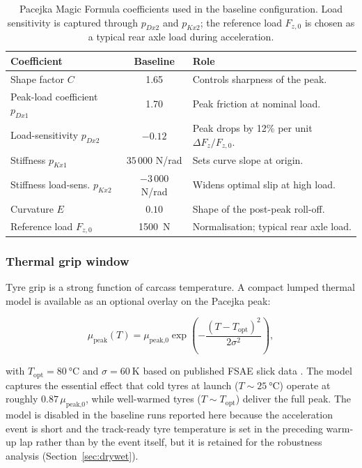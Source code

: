 \begin{table}[H]
\centering
\caption{Pacejka Magic Formula coefficients used in the baseline
configuration. Load sensitivity is captured through $p_{Dx2}$ and
$p_{Kx2}$; the reference load $F_{z,0}$ is chosen as a typical rear
axle load during acceleration.}
\label{tab:pacejka}
\footnotesize
\begin{tabular}{|l|c|l|}
\hline
\textbf{Coefficient} & \textbf{Baseline} & \textbf{Role} \\
\hline
Shape factor $C$                & 1.65   & Controls sharpness of the peak. \\
Peak-load coefficient $p_{Dx1}$ & 1.70   & Peak friction at nominal load. \\
Load-sensitivity $p_{Dx2}$      & $-0.12$ & Peak drops by 12\% per unit $\Delta F_z / F_{z,0}$. \\
Stiffness $p_{Kx1}$             & $35\,000$ N/rad & Sets curve slope at origin. \\
Stiffness load-sens. $p_{Kx2}$  & $-3\,000$ N/rad & Widens optimal slip at high load. \\
Curvature $E$                   & $0.10$ & Shape of the post-peak roll-off. \\
Reference load $F_{z,0}$        & \SI{1500}{\newton} & Normalisation; typical rear axle load. \\
\hline
\end{tabular}
\end{table}

\subsubsection*{Thermal grip window}
\label{sec:thermal}

Tyre grip is a strong function of carcass temperature. A compact
lumped thermal model is available as an optional overlay on the
Pacejka peak:

\begin{equation}
\mu_\text{peak}(T) = \mu_\text{peak,0}
\exp\!\left(-\frac{(T - T_\text{opt})^2}{2 \sigma^2}\right),
\label{eq:thermal}
\end{equation}

with $T_\text{opt} = \SI{80}{\celsius}$ and
$\sigma = \SI{60}{\kelvin}$ based on published FSAE slick data
\cite{milliken1995}. The model captures the essential effect that
cold tyres at launch ($T \sim \SI{25}{\celsius}$) operate at roughly
$0.87\,\mu_\text{peak,0}$, while well-warmed tyres
($T \sim T_\text{opt}$) deliver the full peak. The model is disabled
in the baseline runs reported here because the acceleration event is
short and the track-ready tyre temperature is set in the preceding
warm-up lap rather than by the event itself, but it is retained for
the robustness analysis (Section~\ref{sec:drywet}).

